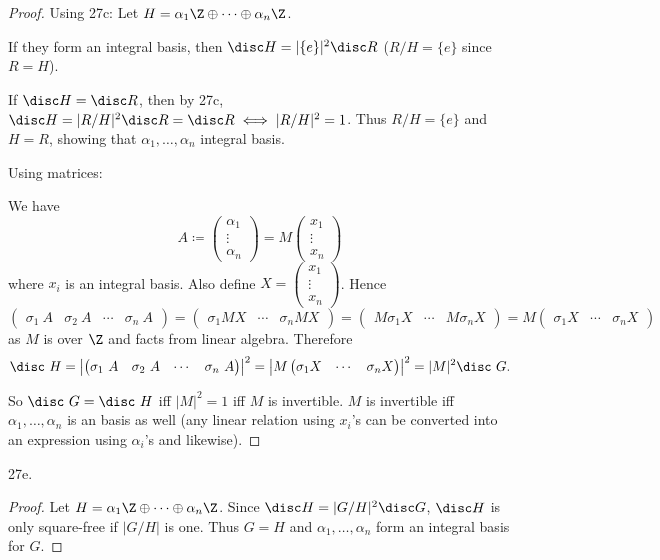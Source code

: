 \documentclass[a4paper]{article}
\begin{document}
\begin{proof}
	Using 27c:
	Let $H = \alpha_{1}\Z \oplus \cdots \oplus \alpha_n\Z $.

	If they form an integral basis, then $\disc H  = |\{e\} |^2\disc R  $ ($R / H = \{e\}  $ since $R = H$).

	If $\disc H = \disc R $, then by 27c, $\disc H = |R / H|^2\disc R = \disc R \iff |R / H|^2 = 1$.
	Thus $R / H = \{e\}   $ and $H = R $, showing that $\alpha_{1},\ldots ,\alpha _n $ integral basis.

	Using matrices:

	We have
	\[
		A \coloneqq \begin{pmatrix} \alpha_1\\ \vdots\\ \alpha_n \end{pmatrix} = M \begin{pmatrix} x_{1}\\ \vdots \\ x_n \end{pmatrix}
	\]
	where $x_i $ is an integral basis.
	Also define $X = \begin{pmatrix} x_{1}\\ \vdots \\ x_n \end{pmatrix}  $.
	Hence
	\[
		\begin{pmatrix} \sigma_1\ A & \sigma_2\ A & \cdots & \sigma_n\ A \end{pmatrix} = \begin{pmatrix} \sigma_1 MX & \cdots & \sigma_n MX \end{pmatrix} = \begin{pmatrix} M\sigma_1 X & \cdots & M\sigma_n X \end{pmatrix} = M\begin{pmatrix} \sigma_1 X & \cdots & \sigma_n X \end{pmatrix}
	\]
	as $M $ is over $\Z $ and facts from linear algebra.
	Therefore
	\[
		\disc\ H = \left|\begin{pmatrix} \sigma_1\ A & \sigma_2\ A & \cdots & \sigma_n\ A \end{pmatrix}\right|^2 = \left|M\begin{pmatrix} \sigma_1 X & \cdots & \sigma_n X \end{pmatrix}\right|^2 = |M|^2 \disc\ G
	.\]

	So $\disc\ G = \disc\ H $ iff $|M|^2 =1$ iff $M $ is invertible.
	$M $ is invertible iff $\alpha _1,\ldots ,\alpha_n$ is an basis as well (any linear relation using $x_i $'s can be converted into an expression using $\alpha_i $'s and likewise).
\end{proof}

27e.

\begin{proof}
	Let $H = \alpha_{1}\Z \oplus \cdots \oplus \alpha_n\Z $.
	Since $\disc H = |G / H|^2 \disc G$, $\disc H $ is only square-free if $|G / H| $ is one.
	Thus $G = H $ and $\alpha_{1},\ldots ,\alpha_n $ form an integral basis for $G $.
\end{proof}
\end{document}
